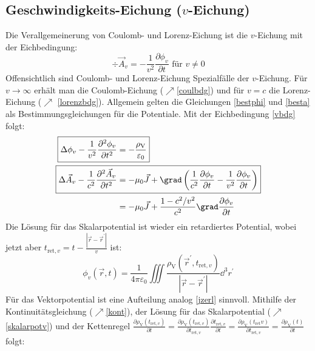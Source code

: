 \subsection{Geschwindigkeits-Eichung ($v$-Eichung)}\label{veich}
Die Verallgemeinerung von Coulomb- und Lorenz-Eichung ist die $v$-Eichung mit der Eichbedingung:
\begin{equation}\label{vbdg}
	\boxed{\div \vec{{A}}_{{v}}=-\frac{1}{{v}^{2}} \frac{\partial \phi_{{v}}}{\partial {t}}} \text { für } {v} \neq 0
\end{equation}
 Offensichtlich sind Coulomb- und Lorenz-Eichung Spezialfälle der $v$-Eichung. Für ${v} \rightarrow \infty$ erhält man die Coulomb-Eichung ($\nearrow$\ref{coulbdg}) und für ${v}={c}$ die Lorenz-Eichung ($\nearrow$ \ref{lorenzbdg}). Allgemein gelten die Gleichungen \ref{bestphi} und \ref{besta} als Bestimmungsgleichungen für die Potentiale. Mit der Eichbedingung \ref{vbdg} folgt:
\begin{align}
	\Aboxed{\Delta \phi_{{v}}-\frac{1}{{v}^{2}} \frac{\partial^{2} \phi_{{v}}}{\partial {t}^{2}} & =-\frac{\rho_\text{V}}{\varepsilon_{0}}} \label{bestskav}\\
\Aboxed{	\Delta \vec{{A}}_{{v}}-\frac{1}{{c}^{2}} \frac{\partial^{2} \vec{{A}}_{{v}}}{\partial {t}^{2}} & =-\mu_{0} \vec{{J}}+\grad\left(\frac{1}{{c}^{2}} \frac{\partial \phi_{{v}}}{\partial {t}}-\frac{1}{{v}^{2}} \frac{\partial \phi_{{v}}}{\partial {t}}\right)} \label{bestvekv} \\
	& =-\mu_{0} \vec{{J}}+\frac{1-{c}^{2} / {v}^{2}}{{c}^{2}} \grad \frac{\partial \phi_{{v}}}{\partial {t}} \nonumber
\end{align}
Die Lösung für das Skalarpotential ist wieder ein retardiertes Potential, wobei jetzt aber $t_{\text{ret}, v}={t}-\frac{\left|\vec{{r}}-\vec{{r}}^{\prime}\right|}{{v}}$ ist:
\begin{equation}\label{skalarpotv}
	\boxed{\phi_{{v}}(\vec{{r}}, {t})=\frac{1}{4 \pi \varepsilon_{0}} \iiint \frac{\rho_\text{V}\left(\vec{{r}}^{\prime}, {t}_{\text{ret}, {v}}\right)}{\left|\vec{{r}}-\vec{{r}}^{\prime}\right|} \dd^3 {r}^{\prime} }
\end{equation}
 Für das Vektorpotential ist eine Aufteilung analog \ref{jzerl} sinnvoll. Mithilfe der Kontinuitätsgleichung ($\nearrow$\ref{kont}), der Lösung für das Skalarpotential ($\nearrow$\ref{skalarpotv}) und der Kettenregel $\frac{\partial \rho_\text{V}\left({t}_{\text {ret}, {v}}\right)}{\partial {t}}=\frac{\partial \rho_\text{V}\left({t}_{\text{ret}, {v}}\right)}{\partial {t}_{\text{ret}, {v}}} \frac{\partial {t}_{\text{ret}, {v}}}{\partial {t}}=\frac{\partial \rho_\text{V}\left({t}_{\text{ret}} {v}\right)}{\partial {t}_{\text{ret}, {v}}}=\frac{\partial \rho_\text{V}({t})}{\partial {t}}$ folgt:


